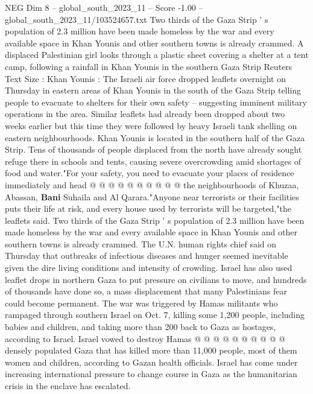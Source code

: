 \begin{textsample}{NEG Dim 8 – global\_south\_2023\_11 – Score -1.00 – global\_south\_2023\_11/103524657.txt}  \label{ex:f8_neg_188}
Two thirds of the Gaza Strip ' s population of 2.3 million have been made homeless by the war and every available space in Khan Younis and other southern towns is already crammed.
A displaced Palestinian girl looks through a plastic sheet covering a shelter at a tent camp, following a rainfall in Khan Younis in the southern Gaza Strip Reuters Text Size : Khan Younis : The Israeli air force dropped leaflets overnight on Thursday in eastern areas of Khan Younis in the south of the Gaza Strip telling people to evacuate to shelters for their own safety -- suggesting imminent military operations in the area.
Similar leaflets had already been dropped about two weeks earlier but this time they were followed by heavy Israeli tank shelling on eastern neighbourhoods.
Khan Younis is located in the southern half of the Gaza Strip.
Tens of thousands of people displaced from the north have already sought refuge there in schools and tents, causing severe overcrowding amid shortages of food and water."For your safety, you need to evacuate your places of residence immediately and head @ @ @ @ @ @ @ @ @ @ the neighbourhoods of Khuzaa, Abassan, \textbf{Bani} Suhaila and Al Qarara."Anyone near terrorists or their facilities puts their life at risk, and every house used by terrorists will be targeted,"the leaflets said.
Two thirds of the Gaza Strip ' s population of 2.3 million have been made homeless by the war and every available space in Khan Younis and other southern towns is already crammed.
The U.N. human rights chief said on Thursday that outbreaks of infectious diseases and hunger seemed inevitable given the dire living conditions and intensity of crowding.
Israel has also used leaflet drops in northern Gaza to put pressure on civilians to move, and hundreds of thousands have done so, a mass displacement that many Palestinians fear could become permanent.
The war was triggered by Hamas militants who rampaged through southern Israel on Oct. 7, killing some 1,200 people, including babies and children, and taking more than 200 back to Gaza as hostages, according to Israel.
Israel vowed to destroy Hamas @ @ @ @ @ @ @ @ @ @ densely populated Gaza that has killed more than 11,000 people, most of them women and children, according to Gazan health officials.
Israel has come under increasing international pressure to change course in Gaza as the humanitarian crisis in the enclave has escalated.

\end{textsample}
